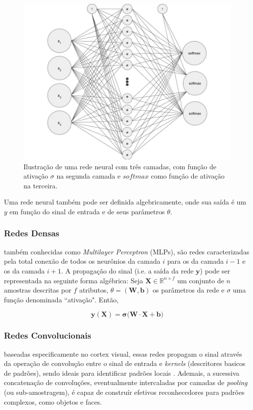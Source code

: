 \documentclass[twoside,conference,a4paper,12px]{IEEEtran}
\begin{document}
\begin{figure}[!ht]
\centering
	\includegraphics[width=.48\textwidth]{assets/nn-base}
	\caption{Ilustração de uma rede neural com três camadas, com função de ativação $\sigma$ na segunda camada e $softmax$ como função de ativação na terceira.}
	\label{fig:nn_base}
\end{figure}

Uma rede neural também pode ser definida algebricamente, onde sua saída é um $y$ em função do sinal de entrada e de seus parâmetros $\theta$.

\subsubsection{Redes Densas}

também conhecidas como \textit{Multilayer Perceptron} (MLPs), são redes caracterizadas pela total conexão de todos os neurônios da camada $i$ para os da camada $i -1$ e os da camada $i + 1$. A propagação do sinal (i.e. a saída da rede $\bm y$) pode ser representada na seguinte forma algébrica:
\newline\newline
Seja $\bm X \in \mathbb{R}^{n \times f}$ um conjunto de $n$ amostras descritas por $f$ atributos, $\theta = (\bm{W, b})$ os parâmetros da rede e $\sigma$ uma função denominada ``ativação". Então,

$$\bm{y(X) = \sigma(W \cdot X + b})$$

\subsubsection{Redes Convolucionais}

baseadas especificamente no cortex visual, essas redes propagam o sinal através da operação de convolução entre o sinal de entrada e \textit{kernels} (descritores basicos de padrões), sendo ideais para identificar padrões locais \cite{krizhevsky2012imagenet}. Ademais, a sucessiva concatenação de convoluções, eventualmente intercaladas por camadas de \textit{pooling} (ou sub-amostragem), é capaz de construír efetivos reconhecedores para padrões complexos, como objetos e faces.
\end{document}
